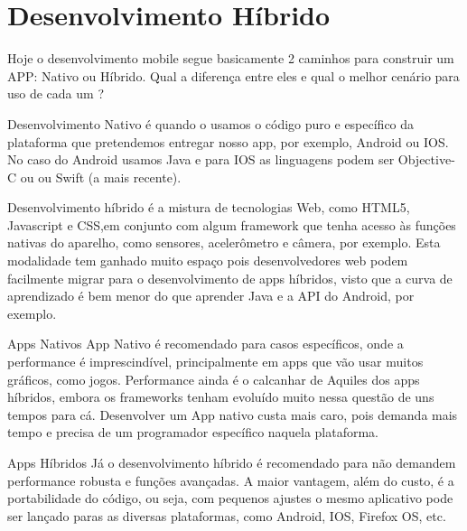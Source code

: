 \section{Desenvolvimento Híbrido}
\label{sec:desenvolvimentohibrido}

Hoje o desenvolvimento mobile segue basicamente 2 caminhos para construir um APP: Nativo ou Híbrido. Qual a diferença entre eles e qual o melhor cenário para uso de cada um ?
 
Desenvolvimento Nativo é quando o usamos o código puro e específico da plataforma que pretendemos entregar nosso app, por exemplo, Android ou IOS. No caso do Android usamos Java e para IOS as linguagens podem ser Objective-C ou ou Swift (a mais recente).
 
Desenvolvimento híbrido é a mistura de tecnologias Web, como HTML5, Javascript e CSS,em conjunto com algum framework que tenha acesso às funções nativas do aparelho, como sensores, acelerômetro e câmera, por exemplo. Esta modalidade tem ganhado muito espaço pois desenvolvedores web podem facilmente migrar para o desenvolvimento de apps híbridos, visto que a curva de aprendizado é bem menor do que aprender Java e a API do Android, por exemplo.

Apps Nativos
App Nativo é recomendado para casos específicos, onde a performance é imprescindível, principalmente em apps que vão usar muitos gráficos, como jogos. Performance ainda é o calcanhar de Aquiles dos apps híbridos, embora os frameworks tenham evoluído muito nessa questão de uns tempos para cá. Desenvolver um App nativo custa mais caro, pois demanda mais tempo e precisa de um programador específico naquela plataforma.

Apps Híbridos
Já o desenvolvimento híbrido é recomendado para não demandem performance robusta e funções avançadas. A maior vantagem, além do custo, é a portabilidade do código, ou seja, com pequenos ajustes o mesmo aplicativo pode ser lançado paras as diversas plataformas, como Android, IOS, Firefox OS, etc. \cite{hibrido}


